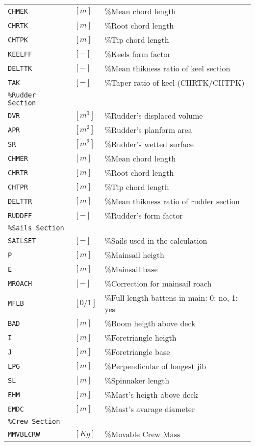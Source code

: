 \documentclass[a4paper,openany]{memoir}
\begin{document}
\begin{table}[h]
{\begin{tabular}{lll}
    \texttt{CHMEK}			&${[m]}$		&\%Mean chord length\\
    \texttt{CHRTK} 			&${[m]}$		&\%Root chord length\\
    \texttt{CHTPK}			&${[m]}$		&\%Tip chord length\\
    \texttt{KEELFF}			&${[-]}$		&\%Keels form factor\\
    \texttt{DELTTK} 		&${[-]}$		&\%Mean thikness ratio of keel section\\
    \texttt{TAK}     		&${[-]}$		&\%Taper ratio of keel (CHRTK/CHTPK)\\
    \texttt{\%Rudder Section}\\
    \texttt{DVR}     		&${[m^3]}$		&\%Rudder's displaced volume\\
    \texttt{APR}     		&${[m^2]}$		&\%Rudder's planform area\\
    \texttt{SR}      		&${[m^2]}$		&\%Rudder's wetted surface\\
    \texttt{CHMER}   		&${[m]}$		&\%Mean chord length\\
    \texttt{CHRTR}   		&${[m]}$		&\%Root chord length\\
    \texttt{CHTPR}   		&${[m]}$		&\%Tip chord length\\
    \texttt{DELTTR}  		&${[m]}$		&\%Mean thikness ratio of rudder section\\	
    \texttt{RUDDFF}  		&${[-]}$		&\%Rudder's form factor\\
    \texttt{\%Sails Section}\\
    \texttt{SAILSET} 		&${[-]}$		&\%Sails used in the calculation\\
    \texttt{P}       		&${[m]}$		&\%Mainsail heigth\\
    \texttt{E}       		&${[m]}$		&\%Mainsail base\\
    \texttt{MROACH}			&${[-]}$		&\%Correction for mainsail roach\\
    \texttt{MFLB}			&${[0/1]}$		&\%Full length battens in main: 0: no, 1: yes\\
    \texttt{BAD}     		&${[m]}$		&\%Boom heigth above deck\\
    \texttt{I}       		&${[m]}$		&\%Foretriangle heigth\\
    \texttt{J}       		&${[m]}$		&\%Foretriangle base\\
    \texttt{LPG}     		&${[m]}$		&\%Perpendicular of longest jib\\
    \texttt{SL}      		&${[m]}$		&\%Spinnaker length\\
    \texttt{EHM}     		&${[m]}$		&\%Mast's heigth above deck\\
    \texttt{EMDC}    		&${[m]}$		&\%Mast's avarage diameter\\
    \texttt{\%Crew Section}\\
    \texttt{MMVBLCRW} 		&${[Kg]}$		&\%Movable Crew Mass\\
  \end{tabular}
  }
\end{table}
\end{document}
